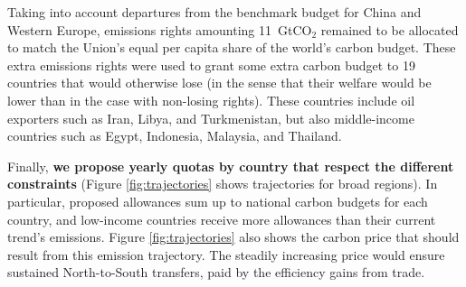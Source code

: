 \documentclass[12pt,english]{article}
\begin{document}
Taking into account departures from the benchmark budget for China and Western Europe, emissions rights amounting 11~GtCO$_\text{2}$ remained to be allocated to match the Union's equal per capita share of the world's carbon budget. %
These extra emissions rights were 
used to grant some extra carbon budget to 19 countries that would otherwise lose (in the sense that their welfare would be lower than in the case with non-losing rights). 
These countries include oil exporters such as %
Iran, Libya, %
and Turkmenistan, but also middle-income countries such as Egypt, 
Indonesia, Malaysia, and Thailand. %

Finally, \textbf{we propose yearly quotas by country that respect the different constraints} (Figure \ref{fig:trajectories} shows trajectories for broad regions). 
In particular, proposed allowances sum up to national carbon budgets for each country, and low-income countries receive more allowances than their current trend's emissions. %
Figure \ref{fig:trajectories} also shows the carbon price that should result from this emission trajectory. The steadily increasing price would ensure sustained North-to-South transfers, paid by the efficiency gains from trade.
\end{document}
